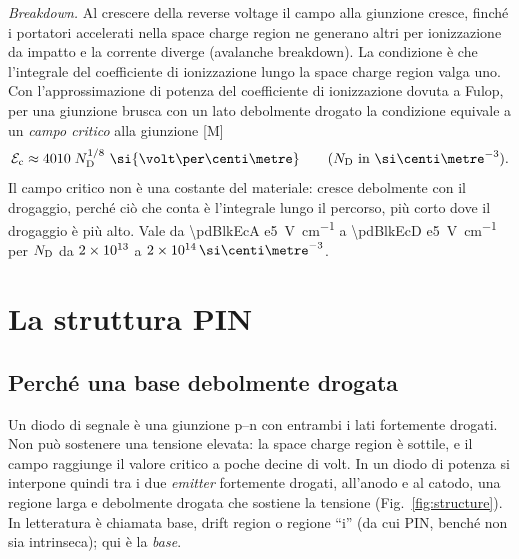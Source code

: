 \documentclass[10pt,a4paper]{scrartcl}
\let\newcommand\pdvaluedefine
\newcommand{\Ec}{\mathcal{E}_\mathrm{c}}      %
\newcommand{\ND}{N_\mathrm{D}}
\newcommand{\Pp}{p\textsuperscript{+}}
\newcommand{\Nm}{n\textsuperscript{--}}
\newcommand{\Np}{n\textsuperscript{+}}
\newcommand{\cmc}{\si{\centi\metre^{-3}}}
\begin{document}
\emph{Breakdown.} Al crescere della reverse voltage il campo alla giunzione cresce, finché i portatori accelerati nella space charge region ne generano altri per ionizzazione da impatto e la corrente diverge (avalanche breakdown). La condizione è che l'integrale del coefficiente di ionizzazione lungo la space charge region valga uno. Con l'approssimazione di potenza del coefficiente di ionizzazione dovuta a Fulop, per una giunzione brusca con un lato debolmente drogato la condizione equivale a un \emph{campo critico} alla giunzione [M]~\cite{baliga}
\begin{equation}
\Ec \approx 4010\;\ND^{1/8}\ \si{\volt\per\centi\metre} \qquad (\ND\ \text{in}\ \cmc) .
\label{eq:ecrit}
\end{equation}
Il campo critico non è una costante del materiale: cresce debolmente con il drogaggio, perché ciò che conta è l'integrale lungo il percorso, più corto dove il drogaggio è più alto. Vale da \SI{\pdBlkEcA e5}{\volt\per\centi\metre} a \SI{\pdBlkEcD e5}{\volt\per\centi\metre} per $\ND$ da $2\times10^{13}$ a $\pdBlkNdD\,\cmc$.

\section{La struttura PIN}
\label{sec:pin}
\subsection{Perché una base debolmente drogata}
\label{sec:why}
Un diodo di segnale è una giunzione p--n con entrambi i lati fortemente drogati. Non può sostenere una tensione elevata: la space charge region è sottile, e il campo raggiunge il valore critico a poche decine di volt. In un diodo di potenza si interpone quindi tra i due \emph{emitter} fortemente drogati, \Pp{} all'anodo e \Np{} al catodo, una regione \Nm{} larga e debolmente drogata che sostiene la tensione (Fig.~\ref{fig:structure}). In letteratura è chiamata base, drift region o regione ``i'' (da cui PIN, benché non sia intrinseca); qui è la \emph{base}.
\end{document}
